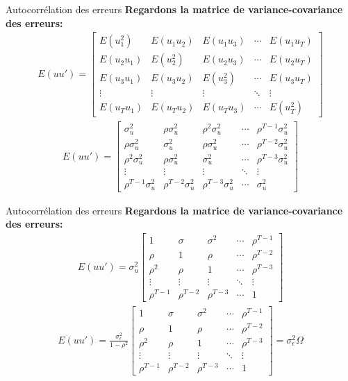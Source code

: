 \documentclass{beamer}
\begin{document}
\begin{frame}{Autocorrélation des erreurs}
\textbf{Regardons la matrice de variance-covariance des erreurs:}
\begin{align*}
E(uu')=\begin{bmatrix}
E(u_1^2) & E(u_1u_2) & E(u_1u_3) & \cdots & E(u_1u_T)\\
E(u_2u_1) & E(u_2^2) & E(u_2u_3) & \cdots & E(u_2u_T)\\
E(u_3u_1) & E(u_3u_2) & E(u_3^2) & \cdots & E(u_3u_T)\\
\vdots & \vdots & \vdots & \ddots & \vdots \\
E(u_Tu_1) & E(u_Tu_2) & E(u_Tu_3) & \cdots & E(u_T^2)
\end{bmatrix}
\end{align*}
\begin{align*}
E(uu')=\begin{bmatrix}
\sigma_u^2 & \rho \sigma_u^2 & \rho^2 \sigma_u^2 & \cdots & \rho^{T-1} \sigma_u^2 \\
\rho \sigma_u^2 & \sigma_u^2 & \rho \sigma_u^2 & \cdots & \rho^{T-2} \sigma_u^2 \\
\rho^2 \sigma_u^2 & \rho \sigma_u^2 & \sigma_u^2 & \cdots & \rho^{T-3} \sigma_u^2 \\
\vdots & \vdots & \vdots & \ddots & \vdots \\
\rho^{T-1} \sigma_u^2 & \rho^{T-2} \sigma_u^2 & \rho^{T-3} \sigma_u^2 & \cdots & \sigma_u^2
\end{bmatrix}
\end{align*}
\end{frame}


\begin{frame}{Autocorrélation des erreurs}
\textbf{Regardons la matrice de variance-covariance des erreurs:}
\begin{align*}
E(uu')=\sigma_u^2\begin{bmatrix}
1 & \sigma & \sigma^2 & \cdots & \rho^{T-1}\\
\rho & 1 & \rho & \cdots & \rho^{T-2} \\
\rho^2 & \rho & 1 & \cdots & \rho^{T-3} \\
\vdots & \vdots & \vdots & \ddots & \vdots\\
\rho^{T-1} & \rho^{T-2} & \rho^{T-3} & \cdots & 1
\end{bmatrix}
\end{align*}
\begin{align*}
E(uu')= \frac{\sigma_{\epsilon}^2}{1-\rho^2} \begin{bmatrix}
1 & \sigma & \sigma^2 & \cdots & \rho^{T-1}\\
\rho & 1 & \rho & \cdots & \rho^{T-2} \\
\rho^2 & \rho & 1 & \cdots & \rho^{T-3} \\
\vdots & \vdots & \vdots & \ddots & \vdots\\
\rho^{T-1} & \rho^{T-2} & \rho^{T-3} & \cdots & 1
\end{bmatrix}=\sigma_{\epsilon}^2 \Omega
\end{align*}
\end{frame}
\end{document}
